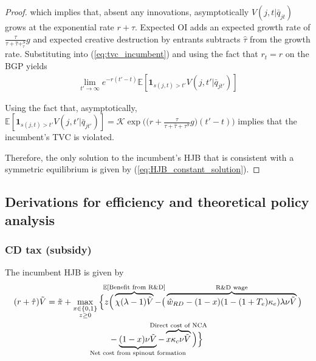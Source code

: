 \documentclass[11pt,english]{article}
\begin{document}
\begin{proof}
	which implies that, absent any innovations, asymptotically $V(j,t|\bar{q}_{jt})$ grows at the exponential rate $r + \hat{\tau}$. Expected OI adds an expected growth rate of $\frac{\tau}{\tau + \hat{\tau} +_\tau^S} g$ and expected creative destruction by entrants subtracts $\hat{\tau}$ from the growth rate. Substituting into (\ref{eq:tvc_incumbent}) and using the fact that $r_t = r$ on the BGP yields
	\begin{align}
	\lim_{t' \to \infty} e^{-r (t' -t)} \mathbb{E}[ \mathbf{1}_{s(j,t) > t'} V(j,t'|\bar{q}_{jt'}) ]
	\end{align}
	
	Using the fact that, asymptotically, $\mathbb{E}[ \mathbf{1}_{s(j,t) > t'} V(j,t'|\bar{q}_{jt'}) ] = \mathcal{K} \exp\Big( \big(r + \frac{\tau}{\tau + \hat{\tau} + \tau^S} g \big) (t' - t)\Big)$ implies that the incumbent's TVC is violated. 
	
	Therefore, the only solution to the incumbent's HJB that is consistent with a symmetric equilibrium is given by (\ref{eq:HJB_constant_solution}).
	
\end{proof}

\subsection{Derivations for efficiency and theoretical policy analysis}

\subsubsection{CD tax (subsidy)}\label{appendix:model:efficiencyderivations:CDtax}

The incumbent HJB is given by 
\begin{align}
(r + \hat{\tau}) \tilde{V} = \tilde{\pi} + \max_{\substack{x \in \{0,1\} \\ z \ge 0}} \Big\{z &\Big( \overbrace{\chi (\lambda - 1) \tilde{V}}^{\mathclap{\mathbb{E}[\textrm{Benefit from R\&D}]}}-  \big( \overbrace{\hat{w}_{RD} - (1-x)(1-(1+T_e)\kappa_e)\lambda \nu \tilde{V}}^{\mathclap{\text{R\&D wage}}}\big) \label{eq:hjb_incumbent_entryTax} \nonumber \\ 
&-  \underbrace{(1-x) \nu \tilde{V}}_{\mathclap{\text{Net cost from spinout formation}}} - \overbrace{x \kappa_{c} \nu \tilde{V}}^{\mathclap{\text{Direct cost of NCA}}}\Big) \Big\} 
\end{align}
\end{document}
